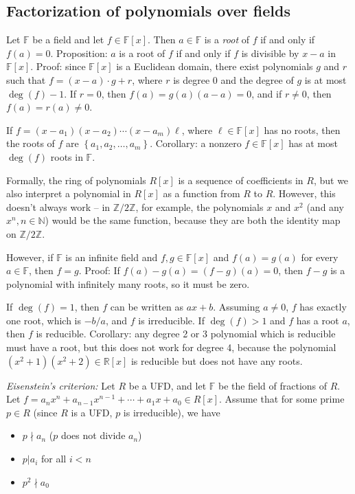 \documentclass[12pt]{article}
\begin{document}
\subsection{Factorization of polynomials over fields}
Let $\mathbb{F}$ be a field and let $f \in \mathbb{F}[x]$. Then $a \in \mathbb{F}$ is a \textit{root} of $f$ if and only if $f(a)=0$. Proposition: $a$ is a root of $f$ if and only if $f$ is divisible by $x-a$ in $\mathbb{F}[x]$. Proof: since $\mathbb{F}[x]$ is a Euclidean domain, there exist polynomials $g$ and $r$ such that $f=(x-a)\cdot g + r$, where $r$ is degree 0 and the degree of $g$ is at most $\operatorname{deg}(f)-1$. If $r=0$, then $f(a)=g(a)(a-a)=0$, and if $r \neq 0$, then $f(a)=r(a)\neq0$.
\par
If $f = (x-a_1)(x-a_2)\cdots (x-a_m) \ell$, where $\ell \in \mathbb{F}[x]$ has no roots, then the roots of $f$ are $ \left\{ a_1, a_2, \dots, a_m \right\}$. Corollary: a nonzero $f \in \mathbb{F}[x]$ has at most $\operatorname{deg}(f)$ roots in $\mathbb{F}$.
\par
Formally, the ring of polynomials $R[x]$ is a sequence of coefficients in $R$, but we also interpret a polynomial in $R[x]$ as a function from $R$ to $R$. However, this doesn't always work -- in $\mathbb{Z}/2\mathbb{Z}$, for example, the polynomials $x$ and $x^2$ (and any $x^n, n \in \mathbb{N}$) would be the same function, because they are both the identity map on $\mathbb{Z}/2\mathbb{Z}$.
\par
However, if $\mathbb{F}$ is an infinite field and $f,g \in \mathbb{F}[x]$ and $f(a)=g(a)$ for every $a \in \mathbb{F}$, then $f=g$. Proof: If $f(a)-g(a)=(f-g)(a)=0$, then $f-g$ is a polynomial with infinitely many roots, so it must be zero.
\par
If $\operatorname{deg}(f)=1$, then $f$ can be written as $ax+b$. Assuming $a \neq 0$, $f$ has exactly one root, which is $-b/a$, and $f$ is irreducible. If $\operatorname{deg}(f) > 1$ and $f$ has a root $a$, then $f$ is reducible. Corollary: any degree 2 or 3 polynomial which is reducible must have a root, but this does not work for degree 4, because the polynomial $(x^2+1)(x^2+2) \in \mathbb{R}[x]$ is reducible but does not have any roots.
\par
\textit{Eisenstein's criterion:} Let $R$ be a UFD, and let $\mathbb{F}$ be the field of fractions of $R$. Let $f = a_n x^n + a_{n-1} x^{n-1} + \cdots + a_1 x + a_0 \in R[x]$. Assume that for some prime $p \in R$ (since $R$ is a UFD, $p$ is irreducible), we have
\begin{itemize}
    \item $p \nmid a_n$ ($p$ does not divide $a_n$)
    \item $p|a_i$ for all $i < n$
    \item $p^2 \nmid a_0$
\end{itemize}
\end{document}
